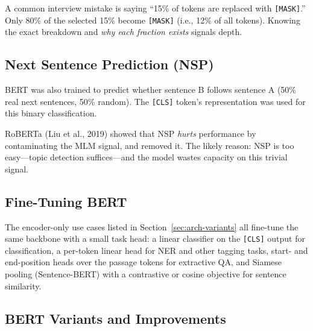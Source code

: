 \begin{warningbox}
A common interview mistake is saying ``15\% of tokens are replaced with
\texttt{[MASK]}.''  Only 80\% of the selected 15\% become \texttt{[MASK]}
(i.e., 12\% of all tokens).  Knowing the exact breakdown and \emph{why each
fraction exists} signals depth.
\end{warningbox}

\subsection{Next Sentence Prediction (NSP)}

BERT was also trained to predict whether sentence B follows sentence A (50\%
real next sentences, 50\% random).  The \texttt{[CLS]} token's representation
was used for this binary classification.

RoBERTa (Liu et al., 2019) showed that NSP \emph{hurts} performance by
contaminating the MLM signal, and removed it.  The likely reason: NSP is too
easy---topic detection suffices---and the model wastes capacity on this trivial
signal.

\subsection{Fine-Tuning BERT}

The encoder-only use cases listed in Section~\ref{sec:arch-variants} all
fine-tune the same backbone with a small task head: a linear classifier on
the \texttt{[CLS]} output for classification, a per-token linear head for
NER and other tagging tasks, start- and end-position heads over the
passage tokens for extractive QA, and Siamese pooling (Sentence-BERT) with
a contrastive or cosine objective for sentence similarity.

\subsection{BERT Variants and Improvements}

